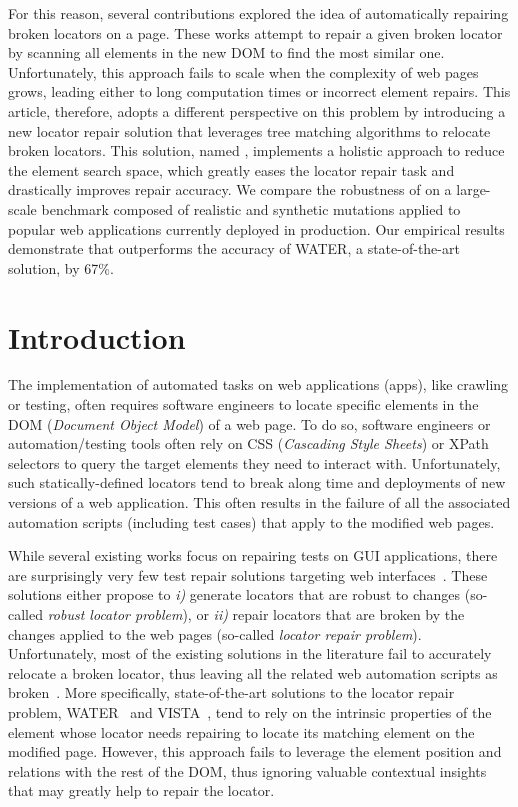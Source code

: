 For this reason, several contributions explored the idea of automatically repairing broken locators on a page. 
These works attempt to repair a given broken locator by scanning all elements in the new DOM to find the most similar one.
Unfortunately, this approach fails to scale when the complexity of web pages grows, leading either to long computation times or incorrect element repairs.
% 
This article, therefore, adopts a different perspective on this problem by introducing a new locator repair solution that leverages tree matching algorithms to relocate broken locators.
This solution, named \erratum{}, implements a holistic approach to reduce the element search space, which greatly eases the locator repair task and drastically improves repair accuracy.
% 
We compare the robustness of \erratum{} on a large-scale benchmark composed of realistic and synthetic mutations applied to popular web applications currently deployed in production.
Our empirical results demonstrate that \erratum{} outperforms the accuracy of WATER, a state-of-the-art solution, by 67\%.

\section{Introduction}
The implementation of automated tasks on web applications (apps), like crawling or testing, often requires software engineers to locate specific elements in the DOM (\emph{Document Object Model}) of a web page.
To do so, software engineers or automation/testing tools often rely on CSS (\emph{Cascading Style Sheets}) or XPath selectors to query the target elements they need to interact with.
Unfortunately, such statically-defined locators tend to break along time and deployments of new versions of a web application.
This often results in the failure of all the associated automation scripts (including test cases) that apply to the modified web pages.

While several existing works focus on repairing tests on GUI applications, there are surprisingly very few test repair solutions targeting web interfaces~\cite{imtiaz2019systematic}.
These solutions either propose to \emph{i)} generate locators that are robust to changes (so-called \emph{robust locator problem}), or \emph{ii)} repair locators that are broken by the changes applied to the web pages (so-called \emph{locator repair problem}).
Unfortunately, most of the existing solutions in the literature fail to accurately relocate a broken locator, thus leaving all the related web automation scripts as broken~\cite{hammoudi2016record}.
% 
More specifically, state-of-the-art solutions to the locator repair problem, WATER~\cite{choudhary2011water} and VISTA~\cite{stocco2018visual}, tend to rely on the intrinsic properties of the element whose locator needs repairing to locate its matching element on the modified page. 
However, this approach fails to leverage the element position and relations with the rest of the DOM, thus ignoring valuable contextual insights that may greatly help to repair the locator.


